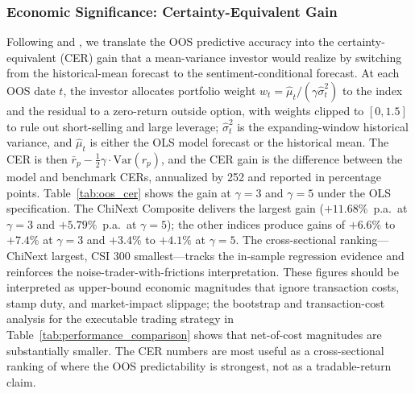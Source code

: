 \documentclass[AER]{AEA}
\begin{document}
\subsubsection{Economic Significance: Certainty-Equivalent Gain}
Following \citet{campbell2008predicting} and \citet{rapach2010out}, we translate the OOS predictive accuracy into the certainty-equivalent (CER) gain that a mean-variance investor would realize by switching from the historical-mean forecast to the sentiment-conditional forecast. At each OOS date $t$, the investor allocates portfolio weight $w_t = \hat\mu_t / (\gamma \hat\sigma_t^2)$ to the index and the residual to a zero-return outside option, with weights clipped to $[0, 1.5]$ to rule out short-selling and large leverage; $\hat\sigma_t^2$ is the expanding-window historical variance, and $\hat\mu_t$ is either the OLS model forecast or the historical mean. The CER is then $\bar r_p - \frac{1}{2}\gamma \cdot \mathrm{Var}(r_p)$, and the CER gain is the difference between the model and benchmark CERs, annualized by 252 and reported in percentage points. Table~\ref{tab:oos_cer} shows the gain at $\gamma=3$ and $\gamma=5$ under the OLS specification. The ChiNext Composite delivers the largest gain ($+11.68\%$~p.a.\ at $\gamma=3$ and $+5.79\%$~p.a.\ at $\gamma=5$); the other indices produce gains of $+6.6\%$ to $+7.4\%$ at $\gamma=3$ and $+3.4\%$ to $+4.1\%$ at $\gamma=5$. The cross-sectional ranking---ChiNext largest, CSI 300 smallest---tracks the in-sample regression evidence and reinforces the noise-trader-with-frictions interpretation. These figures should be interpreted as upper-bound economic magnitudes that ignore transaction costs, stamp duty, and market-impact slippage; the bootstrap and transaction-cost analysis for the executable trading strategy in Table~\ref{tab:performance_comparison} shows that net-of-cost magnitudes are substantially smaller. The CER numbers are most useful as a cross-sectional ranking of where the OOS predictability is strongest, not as a tradable-return claim.
\end{document}
